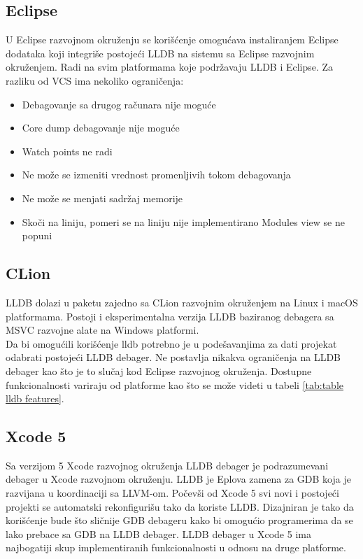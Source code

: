 \documentclass[a4paper]{article}
\begin{document}
\subsection{Eclipse}
U Eclipse razvojnom okruženju se korišćenje omogućava instaliranjem Eclipse dodataka\cite{eclipse_plugin} koji integriše postojeći LLDB na sistemu sa Eclipse razvojnim okruženjem. Radi na svim platformama koje podržavaju LLDB i Eclipse. Za razliku od VCS ima nekoliko ograničenja:

\begin{itemize}
\item Debagovanje sa drugog računara nije moguće
\item Core dump debagovanje nije moguće
\item Watch points ne radi
\item Ne može se izmeniti vrednost promenljivih tokom debagovanja
\item Ne može se menjati sadržaj memorije
\item Skoči na liniju, pomeri se na liniju nije implementirano
Modules view se ne popuni
\end{itemize}

\subsection{CLion}
LLDB dolazi u paketu zajedno sa CLion razvojnim okruženjem na Linux i macOS platformama\cite{clion_lldb}. Postoji i eksperimentalna verzija LLDB baziranog debagera sa MSVC razvojne alate na Windows platformi. \\
\indent Da bi omogućili korišćenje lldb potrebno je u podešavanjima za dati projekat odabrati postojeći LLDB debager. 
Ne postavlja nikakva ograničenja na LLDB debager kao što je to slučaj kod Eclipse razvojnog okruženja.
Dostupne funkcionalnosti variraju od platforme kao što se može videti u tabeli \ref{tab:table lldb features}.

\subsection{Xcode 5}
Sa verzijom 5 Xcode razvojnog okruženja LLDB debager je podrazumevani debager u Xcode razvojnom okruženju. LLDB je Eplova zamena za GDB koja je razvijana u koordinaciji sa LLVM-om. Počevši od Xcode 5 svi novi i postojeći projekti se automatski rekonfigurišu tako da koriste LLDB. Dizajniran je tako da korišćenje bude što sličnije GDB debageru kako bi omogućio programerima da se lako prebace sa GDB na LLDB debager. LLDB debager u Xcode 5 ima najbogatiji skup implementiranih funkcionalnosti u odnosu na druge platforme.
\end{document}

